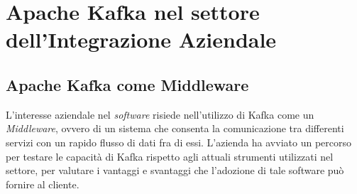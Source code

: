 \chapter{Apache Kafka nel settore dell’Integrazione Aziendale}

%
%
%
%


\section{Apache Kafka come Middleware}

L'interesse aziendale nel \textit{software} risiede nell'utilizzo di Kafka come un  \textit{Middleware}, ovvero di un sistema che consenta la comunicazione tra differenti servizi con un rapido flusso di dati fra di essi.
L'azienda ha avviato un percorso per testare le capacità di Kafka rispetto agli attuali strumenti utilizzati nel settore, per valutare i vantaggi e svantaggi che l'adozione di tale software può fornire al cliente.

